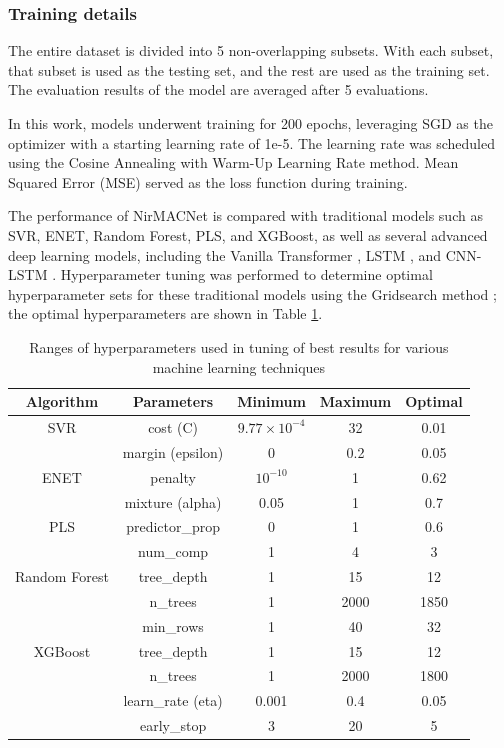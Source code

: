 \documentclass[10pt, a4paper, oneside]{article}
\begin{document}
\subsubsection{Training details}
The entire dataset is divided into 5 non-overlapping subsets. With each subset, that subset is used as the testing set, and the rest are used as the training set. The evaluation results of the model are averaged after 5 evaluations.

In this work, models underwent training for 200 epochs, leveraging SGD as the optimizer with a starting learning rate of 1e-5. The learning rate was scheduled using the Cosine Annealing with Warm-Up Learning Rate method. Mean Squared Error (MSE) served as the loss function during training.

The performance of NirMACNet is compared with traditional models such as SVR, ENET, Random Forest, PLS, and XGBoost, as well as several advanced deep learning models, including the Vanilla Transformer \cite{vaswani2017attention}, LSTM \cite{graves2012long}, and CNN-LSTM \cite{khorram2023hybrid}. Hyperparameter tuning was performed to determine optimal hyperparameter sets for these traditional models using the Gridsearch method \cite{liashchynskyi2019grid}; the optimal hyperparameters are shown in Table \ref{tab:table3}.

\renewcommand{\arraystretch}{1.5}
\setlength{\tabcolsep}{4pt}
\begin{table}
    \centering
    \begin{tabular}{ccccc}
        \hline
        \textbf{Algorithm} & \textbf{Parameters} & \textbf{Minimum} & \textbf{Maximum} & \textbf{Optimal} \\
        \hline
        SVR & cost (C) & $9.77 \times 10^{-4}$ & 32 & 0.01 \\
                     & margin (epsilon) & 0 & 0.2 & 0.05\\
        \hline
        ENET & penalty & $10^{-10}$ & 1 & 0.62 \\
             & mixture (alpha) & 0.05 & 1 & 0.7 \\
        \hline
        PLS & predictor\_prop & 0 & 1 & 0.6 \\
            & num\_comp & 1 & 4 & 3 \\
        \hline
        Random Forest & tree\_depth & 1 & 15 & 12 \\
                      & n\_trees & 1 & 2000 & 1850 \\
                      & min\_rows & 1 & 40 & 32 \\
        \hline 
        XGBoost & tree\_depth & 1 & 15 & 12 \\
                & n\_trees & 1 & 2000 & 1800 \\
                & learn\_rate (eta) & 0.001 & 0.4 & 0.05 \\
                & early\_stop & 3 & 20 & 5 \\
        \hline 
    \end{tabular}
    \caption{Ranges of hyperparameters used in tuning of best results for various machine learning techniques}
    \label{tab:table3}
\end{table}
\end{document}
